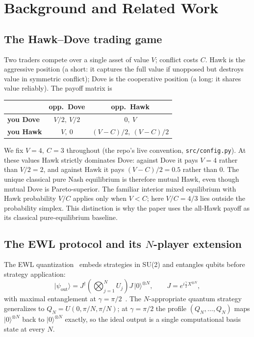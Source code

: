 \documentclass[conference]{IEEEtran}
\newcommand{\ket}[1]{\ensuremath{|#1\rangle}}
\begin{document}
\section{Background and Related Work}\label{sec:background}

\subsection{The Hawk--Dove trading game}
Two traders compete over a single asset of value $V$; conflict costs $C$.
Hawk is the aggressive position (a short: it captures the full value if
unopposed but destroys value in symmetric conflict); Dove is the cooperative
position (a long: it shares value reliably). The payoff matrix is
\begin{center}
\footnotesize
\setlength{\tabcolsep}{3pt}
\renewcommand{\arraystretch}{1.15}
\begin{tabular}{l|cc}
 & \textbf{opp.\ Dove} & \textbf{opp.\ Hawk}\\
\hline
\textbf{you Dove} & $V/2,\ V/2$ & $0,\ V$\\
\textbf{you Hawk} & $V,\ 0$ & $(V{-}C)/2,\ (V{-}C)/2$\\
\end{tabular}
\end{center}
We fix $V{=}4,\ C{=}3$ throughout (the repo's live convention,
\texttt{src/config.py}). At these values Hawk strictly dominates Dove: against
Dove it pays $V=4$ rather than $V/2=2$, and against Hawk it pays
$(V-C)/2=0.5$ rather than $0$. The unique classical pure Nash equilibrium is
therefore mutual Hawk, even though mutual Dove is Pareto-superior. The familiar
interior mixed equilibrium with Hawk probability $V/C$ applies only when
$V<C$; here $V/C=4/3$ lies outside the probability simplex. This distinction
is why the paper uses the all-Hawk payoff as its classical pure-equilibrium
baseline.

\subsection{The EWL protocol and its $N$-player extension}
The EWL quantization~\cite{eisert1999} embeds strategies in SU(2) and
entangles qubits before strategy application:
\begin{equation}
\ket{\psi_{\text{out}}} = J^\dagger \left(\bigotimes_{j=1}^{N} U_j\right) J\, \ket{0}^{\otimes N},
\qquad
J = e^{i \frac{\gamma}{2} X^{\otimes N}},
\end{equation}
with maximal entanglement at $\gamma=\pi/2$~\cite{benjamin2001,chappell2012}.
The $N$-appropriate quantum strategy generalizes to
$Q_N = U(0, \pi/N, \pi/N)$; at $\gamma=\pi/2$ the profile $(Q_N,\dots,Q_N)$
maps $\ket{0}^{\otimes N}$ back to $\ket{0}^{\otimes N}$ exactly, so the ideal
output is a single computational basis state at every $N$.
\end{document}
